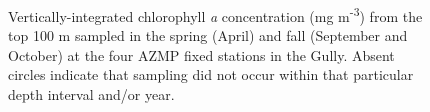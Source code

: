 \documentclass[12pt]{article}\usepackage[]{graphicx}\usepackage[]{color}
\begin{document}
\begin{figure}[htb]

{\centering {} 

}

\caption{Vertically-integrated chlorophyll \emph{a} concentration (mg m\textsuperscript{-3}) from the top 100 m sampled in the spring (April) and fall (September and October) at the four AZMP fixed stations in the Gully. Absent circles indicate that sampling did not occur within that particular depth interval and/or year.}\label{fig:figure24}
\end{figure}
\clearpage
\end{document}
